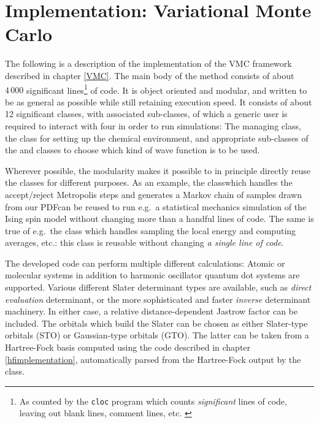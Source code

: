 \documentclass[../../master.tex]{subfiles}
\begin{document}
\chapter{Implementation: Variational Monte Carlo \label{VMCimplementation}}
The following is a description of the implementation of the VMC framework described in chapter \ref{VMC}. The main body of the method consists of about $4\,000$ significant lines\footnote{As counted by the \lstinline{cloc} program which counts \emph{significant} lines of code, leaving out blank lines, comment lines, etc. \cite{cloc}} of \CC{}  code. It is object oriented and modular, and written to be as general as possible while still retaining execution speed. It consists of about 12 significant classes, with associated sub-classes, of which a generic user is required to interact with four in order to run simulations: The managing  class, the  class for setting up the chemical environment, and appropriate sub-classes of the  and  classes to choose which kind of wave function is to be used.

Wherever possible, the modularity makes it possible to in principle directly reuse the classes for different purposes. As an example, the  class\textemdash which handles the accept/reject Metropolis steps and generates a Markov chain of samples drawn from our PDF\textemdash can be reused to run e.g.\ a statistical mechanics simulation of the Ising spin model without changing more than a handful lines of code. The same is true of e.g.\ the  class which handles sampling the local energy and computing averages, etc.: this class is reusable without changing \emph{a single line of code}.

The developed code can perform multiple different calculations: Atomic or molecular systems in addition to harmonic oscillator quantum dot systems are supported. Various different Slater determinant types are available, such as \emph{direct evaluation} determinant, or the more sophisticated and faster \emph{inverse} determinant machinery. In either case, a relative distance-dependent Jastrow factor can be included. The orbitals which build the Slater can be chosen as either Slater-type orbitals (STO) or Gaussian-type orbitals (GTO). The latter can be taken from a Hartree-Fock basis computed using the code described in chapter \ref{hfimplementation}, automatically parsed from the Hartree-Fock output by the  class. 
\end{document}
